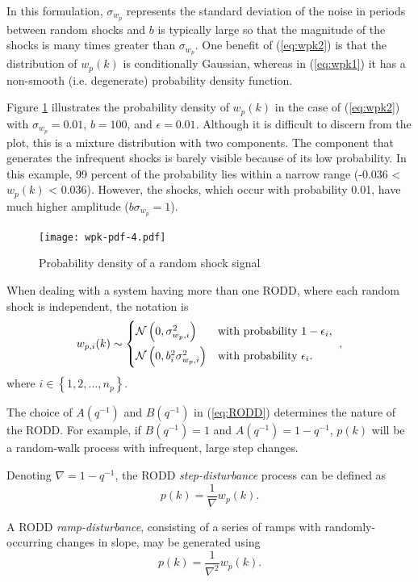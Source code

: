 In this formulation, $\sigma_{w_p}$ represents the standard deviation of the noise in periods between random shocks and $b$ is typically large so that the magnitude of the shocks is many times greater than $\sigma_{w_p}$. One benefit of (\ref{eq:wpk2}) is that the distribution of $w_p(k)$ is conditionally Gaussian, whereas in (\ref{eq:wpk1}) it has a non-smooth (i.e. degenerate) probability density function.

Figure \ref{fig:wpk-pdf} illustrates the probability density of $w_p(k)$ in the case of (\ref{eq:wpk2}) with $\sigma_{w_p}=0.01$, $b=100$, and $\epsilon=0.01$. Although it is difficult to discern from the plot, this is a mixture distribution with two components. The component that generates the infrequent shocks is barely visible because of its low probability. In this example, 99 percent of the probability lies within a narrow range (-0.036 < $w_p(k)$ < 0.036). However, the shocks, which occur with probability 0.01, have much higher amplitude ($b\sigma_{w_p}=1$).

\begin{figure}[htp]
	\centering
	\texttt{[image: wpk-pdf-4.pdf]}
	\caption{Probability density of a random shock signal}
	\label{fig:wpk-pdf}
\end{figure}

When dealing with a system having more than one RODD, where each random shock is independent, the notation is
\begin{equation} \label{eq:wpik2}
	w_{p,i}(k) \sim 
	\begin{cases*}
		\mathcal{N}\left(0, \sigma_{w_p,i}^2\right) & with probability $1-\epsilon_i$, \\
		\mathcal{N}\left(0, b_i^2\sigma_{w_p,i}^2\right) & with probability $\epsilon_i$.
	\end{cases*},
\end{equation}
where $i \in \left\{1, 2, ..., n_p\right\}$.

The choice of $A(q^{-1})$ and $B(q^{-1})$ in (\ref{eq:RODD}) determines the nature of the RODD. For example, if $B(q^{-1})=1$ and $A(q^{-1})=1-q^{-1}$, $p(k)$ will be a random-walk process with infrequent, large step changes.

Denoting $\nabla=1-q^{-1}$, the RODD \textit{step-disturbance} process can be defined as
\begin{equation} \label{eq:RODD-step}
	p(k)= \frac{1}{\nabla}w_p(k).
\end{equation}

A RODD \textit{ramp-disturbance}, consisting of a series of ramps with randomly-occurring changes in slope, may be generated using
\begin{equation} \label{eq:RODD-ramp}
	p(k)= \frac{1}{\nabla^2}w_p(k).
\end{equation}

